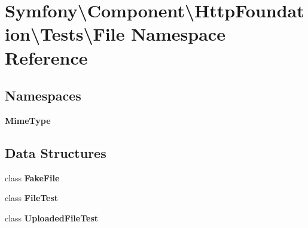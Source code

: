 \section{Symfony\textbackslash{}Component\textbackslash{}Http\+Foundation\textbackslash{}Tests\textbackslash{}File Namespace Reference}
\label{namespace_symfony_1_1_component_1_1_http_foundation_1_1_tests_1_1_file}
\subsection*{Namespaces}
\begin{DoxyCompactItemize}
\item 
 {\bf Mime\+Type}
\end{DoxyCompactItemize}
\subsection*{Data Structures}
\begin{DoxyCompactItemize}
\item 
class {\bf Fake\+File}
\item 
class {\bf File\+Test}
\item 
class {\bf Uploaded\+File\+Test}
\end{DoxyCompactItemize}
